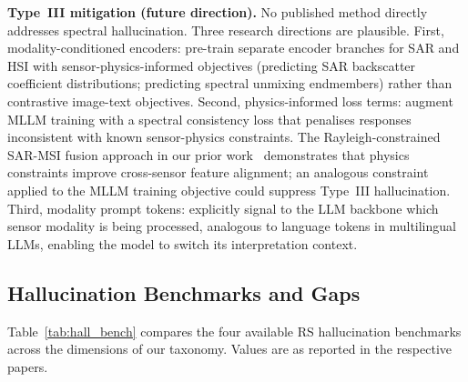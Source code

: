 \textbf{Type~III mitigation (future direction).}
No published method directly addresses spectral hallucination. Three
research directions are plausible. First, modality-conditioned encoders:
pre-train separate encoder branches for SAR and HSI with
sensor-physics-informed objectives (predicting SAR backscatter
coefficient distributions; predicting spectral unmixing endmembers)
rather than contrastive image-text objectives. Second,
physics-informed loss terms: augment MLLM training with a spectral
consistency loss that penalises responses inconsistent with known
sensor-physics constraints. The Rayleigh-constrained SAR-MSI fusion
approach in our prior work~\cite{rayleigh2026} demonstrates that
physics constraints improve cross-sensor feature alignment; an
analogous constraint applied to the MLLM training objective could
suppress Type~III hallucination. Third, modality prompt tokens:
explicitly signal to the LLM backbone which sensor modality is being
processed, analogous to language tokens in multilingual LLMs, enabling
the model to switch its interpretation context.

\subsection{Hallucination Benchmarks and Gaps}\label{sec7:bench}

Table~\ref{tab:hall_bench} compares the four available RS hallucination
benchmarks across the dimensions of our taxonomy. Values are as reported
in the respective papers.

